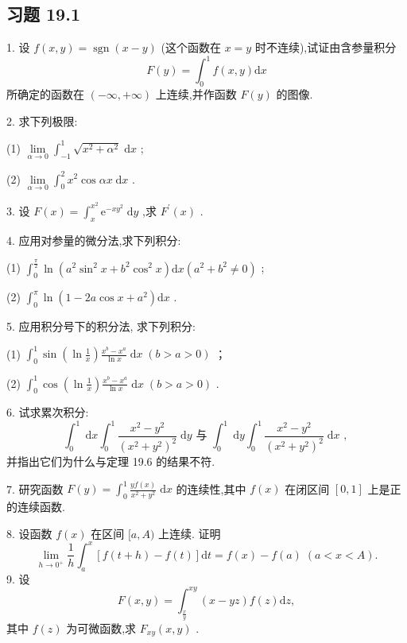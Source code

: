 \subsection{习题 19.1}

1. 设 \(f\left( {x,y}\right)  = \operatorname{sgn}\left( {x - y}\right)\) (这个函数在 \(x = y\) 时不连续),试证由含参量积分
\[
F\left( y\right)  = {\int }_{0}^{1}f\left( {x,y}\right) \mathrm{d}x
\]
所确定的函数在 \(\left( {-\infty , + \infty }\right)\) 上连续,并作函数 \(F\left( y\right)\) 的图像.

2. 求下列极限:

(1) \(\mathop{\lim }\limits_{{\alpha  \rightarrow  0}}{\int }_{-1}^{1}\sqrt{{x}^{2} + {\alpha }^{2}}\mathrm{\;d}x\) ;

(2) \(\mathop{\lim }\limits_{{\alpha  \rightarrow  0}}{\int }_{0}^{2}{x}^{2}\cos {\alpha x}\mathrm{\;d}x\) .

3. 设 \(F\left( x\right)  = {\int }_{x}^{{x}^{2}}{\mathrm{e}}^{-x{y}^{2}}\mathrm{\;d}y\) ,求 \({F}^{\prime }\left( x\right)\) .

4. 应用对参量的微分法,求下列积分:

(1) \({\int }_{0}^{\frac{\pi }{2}}\ln \left( {{a}^{2}{\sin }^{2}x + {b}^{2}{\cos }^{2}x}\right) \mathrm{d}x\left( {{a}^{2} + {b}^{2} \neq  0}\right)\) ;

(2) \({\int }_{0}^{\pi }\ln \left( {1 - {2a}\cos x + {a}^{2}}\right) \mathrm{d}x\) .

5. 应用积分号下的积分法, 求下列积分:

(1) \({\int }_{0}^{1}\sin \left( {\ln \frac{1}{x}}\right) \frac{{x}^{b} - {x}^{a}}{\ln x}\mathrm{\;d}x\;\left( {b > a > 0}\right)\) ；

(2) \({\int }_{0}^{1}\cos \left( {\ln \frac{1}{x}}\right) \frac{{x}^{b} - {x}^{a}}{\ln x}\mathrm{\;d}x\;\left( {b > a > 0}\right)\) .

6. 试求累次积分:
\[
{\int }_{0}^{1}\mathrm{\;d}x{\int }_{0}^{1}\frac{{x}^{2} - {y}^{2}}{{\left( {x}^{2} + {y}^{2}\right) }^{2}}\mathrm{\;d}y\text{ 与 }{\int }_{0}^{1}\mathrm{\;d}y{\int }_{0}^{1}\frac{{x}^{2} - {y}^{2}}{{\left( {x}^{2} + {y}^{2}\right) }^{2}}\mathrm{\;d}x\text{ , }
\]
并指出它们为什么与定理 19.6 的结果不符.

7. 研究函数 \(F\left( y\right)  = {\int }_{0}^{1}\frac{{yf}\left( x\right) }{{x}^{2} + {y}^{2}}\mathrm{\;d}x\) 的连续性,其中 \(f\left( x\right)\) 在闭区间 \(\left\lbrack  {0,1}\right\rbrack\) 上是正的连续函数.

8. 设函数 \(f\left( x\right)\) 在区间 \(\lbrack a,A)\) 上连续. 证明
\[
\mathop{\lim }\limits_{{h \rightarrow  {0}^{ + }}}\frac{1}{h}{\int }_{a}^{x}\left\lbrack  {f\left( {t + h}\right)  - f\left( t\right) }\right\rbrack  \mathrm{d}t = f\left( x\right)  - f\left( a\right) \;\left( {a < x < A}\right) .
\]
9. 设
\[
F\left( {x,y}\right)  = {\int }_{\frac{x}{y}}^{xy}\left( {x - {yz}}\right) f\left( z\right) \mathrm{d}z,
\]
其中 \(f\left( z\right)\) 为可微函数,求 \({F}_{xy}\left( {x,y}\right)\) .

